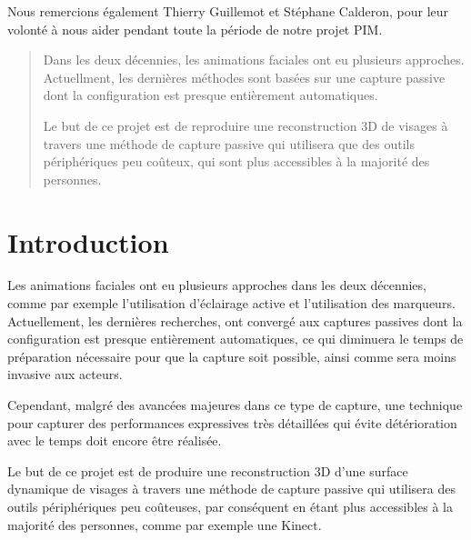 \documentclass[a4paper,12pt]{article}
\begin{document}
Nous remercions également Thierry Guillemot et Stéphane Calderon, pour
leur volonté à nous aider pendant toute la période de notre projet PIM. 

\newpage
\thispagestyle{empty}
\begin{abstract}

Dans les deux décennies, les animations faciales ont eu plusieurs approches.
Actuellment, les dernières méthodes sont basées sur une capture
passive dont la configuration est presque entièrement automatiques. 

Le but de ce projet est de reproduire une reconstruction 3D de visages
à travers une méthode de capture passive qui utilisera que des outils
périphériques peu coûteux, qui sont plus accessibles à la majorité des
personnes. 

\end{abstract}


\newpage
\thispagestyle{empty}
\tableofcontents
\newpage
\setcounter{page}{1}

\section{Introduction}

Les animations faciales ont eu plusieurs approches dans les deux
décennies, comme par exemple l'utilisation d'éclairage active et
l'utilisation des marqueurs. Actuellement, les dernières recherches,
ont convergé aux captures passives dont la configuration est presque
entièrement automatiques, ce qui diminuera le temps de préparation
nécessaire pour que la capture soit possible, ainsi comme sera moins invasive aux
acteurs.

Cependant, malgré des avancées majeures dans ce type de capture, une
technique pour capturer des performances expressives très détaillées
qui évite détérioration avec le temps doit encore être réalisée.

Le but de ce projet est de produire une reconstruction 3D d'une
surface dynamique de visages à travers une méthode de capture passive
qui utilisera des outils périphériques peu coûteuses, par conséquent
en étant plus accessibles à la majorité des personnes, comme par
exemple une Kinect.


\end{document}
